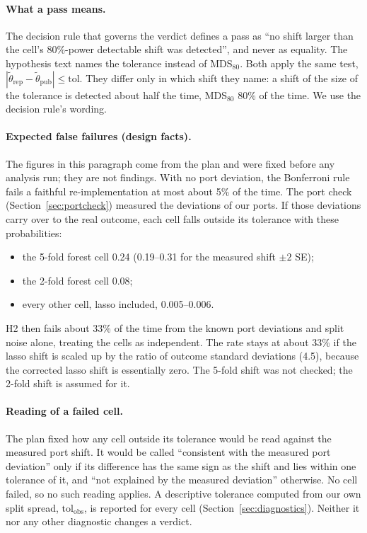 \documentclass[11pt]{article}
\begin{document}
\paragraph{What a pass means.} The decision rule that governs the verdict defines a pass as
``no shift larger than the cell's 80\%-power detectable shift was detected'', and never as
equality. The hypothesis text names the tolerance instead of MDS$_{80}$. Both apply the
same test, $|\tilde\theta_{\text{rep}} - \tilde\theta_{\text{pub}}| \le \text{tol}$. They
differ only in which shift they name: a shift of the size of the tolerance is detected
about half the time, MDS$_{80}$ 80\% of the time. We use the decision rule's wording.

\paragraph{Expected false failures (design facts).} The figures in this paragraph come from
the plan and were fixed before any analysis run; they are not findings. With no port
deviation, the Bonferroni rule fails a faithful re-implementation at most about 5\% of
the time. The port check (Section~\ref{sec:portcheck}) measured the deviations of our
ports. If those deviations carry over to the real outcome, each cell falls outside its
tolerance with these probabilities:
\begin{itemize}
  \item the 5-fold forest cell 0.24 (0.19--0.31 for the measured shift $\pm 2$ SE);
  \item the 2-fold forest cell 0.08;
  \item every other cell, lasso included, 0.005--0.006.
\end{itemize}
H2 then fails about 33\% of the time from the known port deviations and split noise
alone, treating the cells as independent. The rate stays at about 33\% if the lasso
shift is scaled up by the ratio of outcome standard deviations (4.5), because the
corrected lasso shift is essentially zero. The 5-fold shift was not checked; the 2-fold
shift is assumed for it.

\paragraph{Reading of a failed cell.} The plan fixed how any cell outside its tolerance
would be read against the measured port shift. It would be called ``consistent with the
measured port deviation'' only if its difference has the same sign as the shift and lies
within one tolerance of it, and ``not explained by the measured deviation'' otherwise.
No cell failed, so no such reading applies. A descriptive tolerance computed from our own
split spread, $\text{tol}_{\text{obs}}$, is reported for every cell
(Section~\ref{sec:diagnostics}). Neither it nor any other diagnostic changes a verdict.
\end{document}
